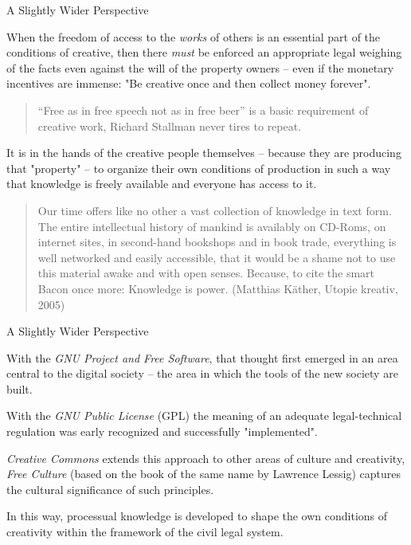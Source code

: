 \documentclass{beamer}
\begin{document}
\begin{frame}{A Slightly Wider Perspective}
  
When the freedom of access to the \emph{works} of others is an essential part
of the conditions of creative, then there \emph{must} be enforced an
appropriate legal weighing of the facts even against the will of the property
owners -- even if the monetary incentives are immense: "Be creative once and
then collect money forever".  
\begin{quote}\footnotesize
  “Free as in free speech not as in free beer” is a basic requirement of
  creative work, Richard Stallman never tires to repeat.
\end{quote}\vspace{-1em}
  
It is in the hands of the creative people themselves -- because they are
producing that "property" -- to organize their own conditions of production in
such a way that knowledge is freely available and everyone has access to it.
\begin{quote}\footnotesize
  Our time offers like no other a vast collection of knowledge in text form.
  The entire intellectual history of mankind is availably on CD-Roms, on
  internet sites, in second-hand bookshops and in book trade, everything is
  well networked and easily accessible, that it would be a shame not to use
  this material awake and with open senses. Because, to cite the smart Bacon
  once more: Knowledge is power. (Matthias Käther, Utopie kreativ, 2005)
\end{quote}
\end{frame}

\begin{frame}{A Slightly Wider Perspective}

With the \emph{GNU Project and Free Software}, that thought first emerged in
an area central to the digital society -- the area in which the tools of the
new society are built.

With the \emph{GNU Public License} (GPL) the meaning of an adequate
legal-technical regulation was early recognized and successfully
"implemented".

\emph{Creative Commons} extends this approach to other areas of culture and
creativity, \emph{Free Culture} (based on the book of the same name by
Lawrence Lessig) captures the cultural significance of such principles.

In this way, processual knowledge is developed to shape the own conditions of
creativity within the framework of the civil legal system.
\end{frame}
\end{document}
